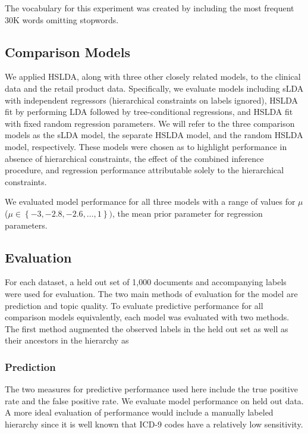 \documentclass{article}
\begin{document}
The vocabulary for this experiment was created by including the most
frequent 30K words omitting stopwords.


\subsection{Comparison Models}

We applied HSLDA, along with three other closely related models, to
the clinical data and the retail product data. Specifically, we evaluate
models including sLDA with independent regressors (hierarchical constraints
on labels ignored), HSLDA fit by performing LDA followed by tree-conditional
regressions, and HSLDA fit with fixed random regression parameters.
We will refer to the three comparison models as the sLDA model, the
separate HSLDA model, and the random HSLDA model, respectively. These
models were chosen as to highlight performance in absence of hierarchical
constraints, the effect of the combined inference procedure, and regression
performance attributable solely to the hierarchical constraints.

We evaluated model performance for all three models with a range of
values for $\mu$ ($\mu\in\left\{ -3,-2.8,-2.6,\ldots,1\right\} )$,
the mean prior parameter for regression parameters. 


\subsection{Evaluation}
For each dataset, a held out set of 1,000 documents and accompanying
labels were used for evaluation. The two main methods of evaluation
for the model are prediction and topic quality. To evaluate predictive
performance for all comparison models equivalently, each model was
evaluated with two methods. The first method augmented the observed
labels in the held out set as well as their ancestors in the hierarchy
as 


\subsubsection{Prediction}

The two measures for predictive performance used here include the
true positive rate and the false positive rate. We evaluate model
performance on held out data. A more ideal evaluation of performance
would include a manually labeled hierarchy since it is well known
that ICD-9 codes have a relatively low sensitivity.
\end{document}
